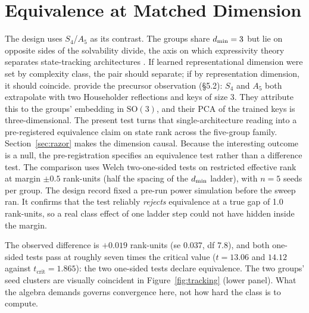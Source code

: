 \section{Equivalence at Matched Dimension}
\label{sec:equivalence}

The design uses $S_4$/$A_5$ as its contrast. The groups share $d_{\min} = 3$ but
lie on opposite sides of the solvability divide, the axis on which expressivity
theory separates state-tracking architectures
\citep{merrill2024illusion, grazzi2025negative,
siems2025deltaproduct}. If learned representational dimension were set
by complexity class, the pair should separate; if by representation
dimension, it should coincide. \citet{siems2025deltaproduct} provide the
precursor observation (\S5.2): $S_4$ and $A_5$ both extrapolate with two
Householder reflections and keys of size 3. They attribute this to the groups'
embedding in $\mathrm{SO}(3)$, and their PCA of the trained keys is
three-dimensional. The present test turns that single-architecture reading
into a pre-registered equivalence claim on state rank across the five-group
family. Section~\ref{sec:razor} makes the dimension causal. Because the
interesting outcome is a null, the pre-registration specifies an equivalence
test rather than a difference test. The comparison uses Welch two-one-sided
tests on restricted effective rank at margin $\pm 0.5$ rank-units (half the
spacing of the $d_{\min}$ ladder), with $n = 5$ seeds per group. The design record
fixed a pre-run power simulation before the sweep ran. It confirms that the
test reliably \emph{rejects} equivalence at a true gap of 1.0 rank-units, so a
real class effect of one ladder step could not have hidden inside the margin.

The observed difference is $+0.019$ rank-units (se 0.037, df 7.8), and
both one-sided tests pass at roughly seven times the critical value
($t = 13.06$ and $14.12$ against $t_{\mathrm{crit}} = 1.865$): the two
one-sided tests declare equivalence.
The two groups' seed clusters are visually coincident in
Figure~\ref{fig:tracking} (lower panel). What the algebra demands governs
convergence here, not how hard the class is to compute.
